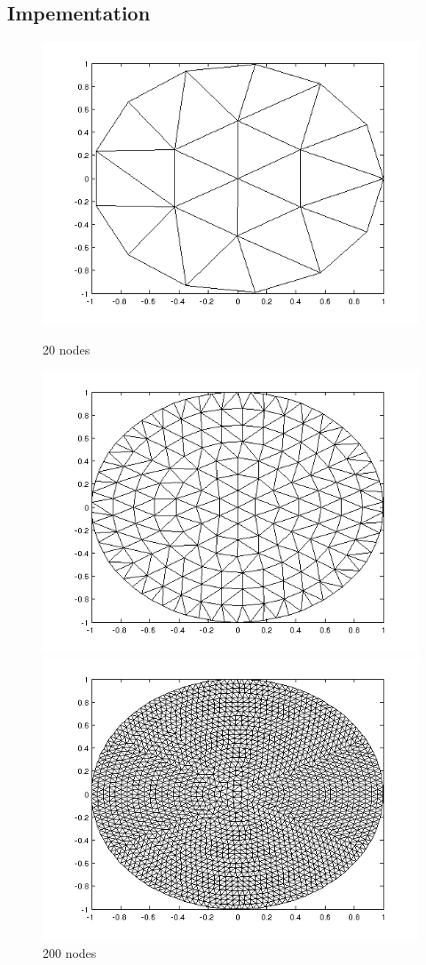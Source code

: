 \documentclass[paper=a4, fontsize=11pt]{scrartcl} %
\begin{document}
\subsection{Impementation}
\begin{figure}[!htb]
  \includegraphics[width=\linewidth]{2d20.png}
  \caption{20 nodes}\label{fig:2d20}
\endminipage\hfill
{}
  \includegraphics[width=\linewidth]{2d200.png}
  \caption{200 nodes}\label{fig:2d200}
\endminipage\hfill
{}%
  \includegraphics[width=\linewidth]{2d2000.png}

\end{figure}
\end{document}
